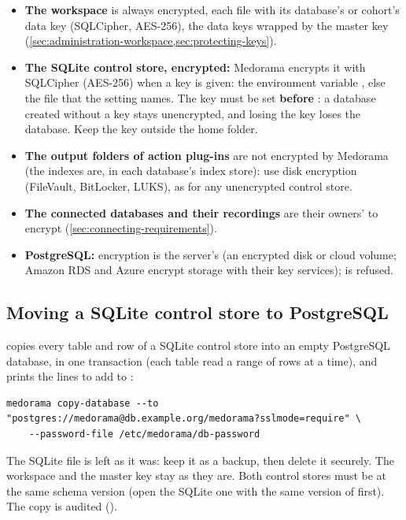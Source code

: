 \begin{itemize}
\item \textbf{The workspace} is always encrypted, each file with its database's or cohort's data
  key (SQLCipher, AES-256), the data keys wrapped by the master key
  (\cref{sec:administration-workspace,sec:protecting-keys}).
\item \textbf{The SQLite control store, encrypted:} Medorama encrypts it with SQLCipher (AES-256)
  when a key is given: the environment variable , else the file that the
  setting  names. The key must be set \textbf{before} : a database
  created without a key stays unencrypted, and losing the key loses the database. Keep the key
  outside the home folder.
\item \textbf{The output folders of action plug-ins} are not encrypted by Medorama (the indexes
  are, in each database's index store): use disk encryption (FileVault, BitLocker, LUKS), as for any unencrypted control
  store.
\item \textbf{The connected databases and their recordings} are their owners' to encrypt
  (\cref{sec:connecting-requirements}).
\item \textbf{PostgreSQL:} encryption is the server's (an encrypted disk or cloud volume; Amazon
  RDS and Azure encrypt storage with their key services);  is refused.
\end{itemize}

\subsection{Moving a SQLite control store to PostgreSQL}
\label{sec:deployment-copy}

 copies every table and row of a SQLite control store into an empty
PostgreSQL database, in one transaction (each table read a range of rows at a time), and prints
the lines to add to :
\begin{lstlisting}[style=shell]
medorama copy-database --to "postgres://medorama@db.example.org/medorama?sslmode=require" \
    --password-file /etc/medorama/db-password
\end{lstlisting}
The SQLite file is left as it was: keep it as a backup, then delete it securely. The workspace
and the master key stay as they are. Both control stores must be at the same schema version (open the SQLite one with the same version of
\cmd{medorama} first). The copy is audited (\code{copy\_database}).

